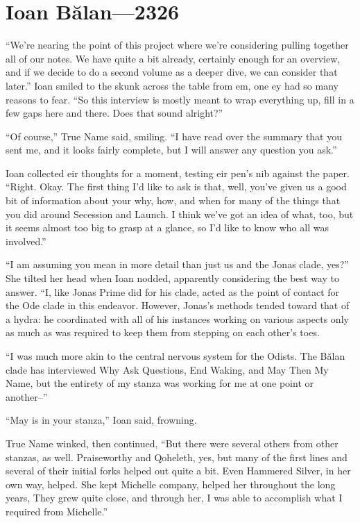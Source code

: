 \hypertarget{ioan-bux103lan-2326}{%
\chapter{Ioan Bălan—2326}\label{ioan-bux103lan-2326}}

``We're nearing the point of this project where we're considering pulling together all of our notes. We have quite a bit already, certainly enough for an overview, and if we decide to do a second volume as a deeper dive, we can consider that later.'' Ioan smiled to the skunk across the table from em, one ey had so many reasons to fear. ``So this interview is mostly meant to wrap everything up, fill in a few gaps here and there. Does that sound alright?''

``Of course,'' True Name said, smiling. ``I have read over the summary that you sent me, and it looks fairly complete, but I will answer any question you ask.''

Ioan collected eir thoughts for a moment, testing eir pen's nib against the paper. ``Right. Okay. The first thing I'd like to ask is that, well, you've given us a good bit of information about your why, how, and when for many of the things that you did around Secession and Launch. I think we've got an idea of what, too, but it seems almost too big to grasp at a glance, so I'd like to know who all was involved.''

``I am assuming you mean in more detail than just us and the Jonas clade, yes?'' She tilted her head when Ioan nodded, apparently considering the best way to answer. ``I, like Jonas Prime did for his clade, acted as the point of contact for the Ode clade in this endeavor. However, Jonas's methods tended toward that of a hydra: he coordinated with all of his instances working on various aspects only as much as was required to keep them from stepping on each other's toes.

``I was much more akin to the central nervous system for the Odists. The Bălan clade has interviewed Why Ask Questions, End Waking, and May Then My Name, but the entirety of my stanza was working for me at one point or another--''

``May is in your stanza,'' Ioan said, frowning.

True Name winked, then continued, ``But there were several others from other stanzas, as well. Praiseworthy and Qoheleth, yes, but many of the first lines and several of their initial forks helped out quite a bit. Even Hammered Silver, in her own way, helped. She kept Michelle company, helped her throughout the long years, They grew quite close, and through her, I was able to accomplish what I required from Michelle.''


